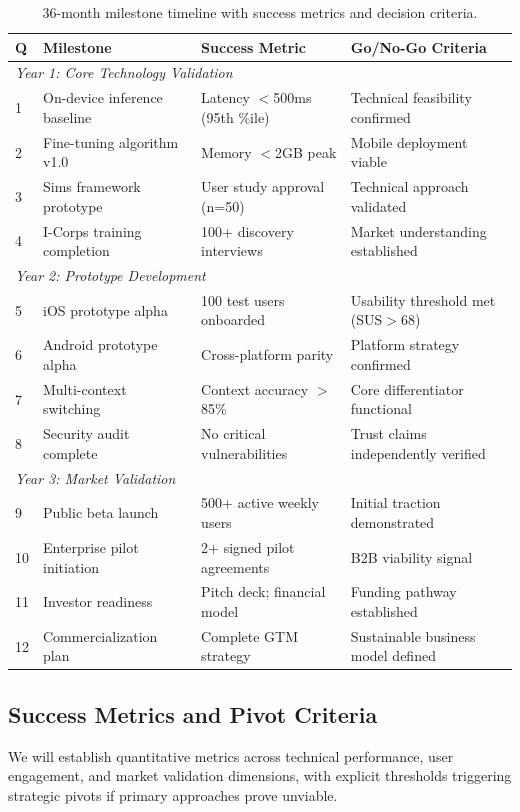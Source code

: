 \documentclass[11pt]{article}
\begin{document}
\begin{table}[t]
\centering
\caption{36-month milestone timeline with success metrics and decision criteria.\vspace*{16pt}}
\small
\begin{tabular}{p{0.8cm}p{5.5cm}p{4cm}p{5.5cm}}
\toprule
\textbf{Q} & \textbf{Milestone} & \textbf{Success Metric} & \textbf{Go/No-Go Criteria} \\
\midrule
\multicolumn{4}{l}{\textit{Year 1: Core Technology Validation}} \\
1 & On-device inference baseline & Latency $<$500ms (95th \%ile) & Technical feasibility confirmed \\
2 & Fine-tuning algorithm v1.0 & Memory $<$2GB peak & Mobile deployment viable \\
3 & Sims framework prototype & User study approval (n=50) & Technical approach validated \\
4 & I-Corps training completion & 100+ discovery interviews & Market understanding established \\
\midrule
\multicolumn{4}{l}{\textit{Year 2: Prototype Development}} \\
5 & iOS prototype alpha & 100 test users onboarded & Usability threshold met (SUS$>$68) \\
6 & Android prototype alpha & Cross-platform parity & Platform strategy confirmed \\
7 & Multi-context switching & Context accuracy $>$85\% & Core differentiator functional \\
8 & Security audit complete & No critical vulnerabilities & Trust claims independently verified \\
\midrule
\multicolumn{4}{l}{\textit{Year 3: Market Validation}} \\
9 & Public beta launch & 500+ active weekly users & Initial traction demonstrated \\
10 & Enterprise pilot initiation & 2+ signed pilot agreements & B2B viability signal \\
11 & Investor readiness & Pitch deck; financial model & Funding pathway established \\
12 & Commercialization plan & Complete GTM strategy & Sustainable business model defined \\
\bottomrule
\end{tabular}
\label{tab:milestones}
\end{table}

\vspace*{-8pt}
\subsection{Success Metrics and Pivot Criteria}
\vspace*{-8pt}
We will establish quantitative metrics across technical performance, user engagement, and market validation dimensions, with explicit thresholds triggering strategic pivots if primary approaches prove unviable.
\end{document}
